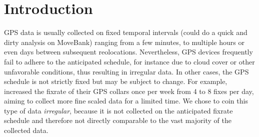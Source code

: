 \documentclass[abstract=on,10pt,a4paper,bibliography=totocnumbered]{article}
\begin{document}
\newpage

\onehalfspacing
\tableofcontents
\doublespacing

\newpage
{}


\section{Introduction}
GPS data is usually collected on fixed temporal intervals (could do a quick and
dirty analysis on MoveBank) ranging from a few minutes, to multiple hours or
even days between subsequent reolocations. Nevertheless, GPS devices frequently
fail to adhere to the anticipated schedule, for instance due to cloud cover or
other unfavorable conditions, thus resulting in irregular data. In other cases,
the GPS schedule is not strictly fixed but may be subject to change. For
example, \cite{Cozzi.2020} increased the fixrate of their GPS collars once per
week from 4 to 8 fixes per day, aiming to collect more fine scaled data for a
limited time. We chose to coin this type of data \textit{irregular}, because it
is not collected on the anticipated fixrate schedule and therefore not directly
comparable to the vast majority of the collected data.
\end{document}
